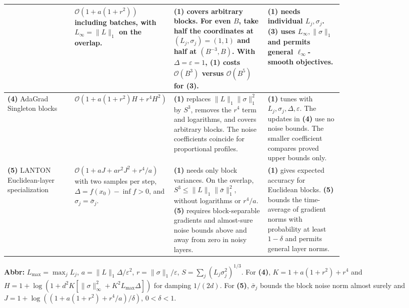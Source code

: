 \begin{table}[tp]
\begin{threeparttable}
\begin{tabularx}{\linewidth}{@{}>{\raggedright\arraybackslash}p{0.20\linewidth}>{\raggedright\arraybackslash}p{0.29\linewidth}>{\raggedright\arraybackslash}p{0.29\linewidth}>{\raggedright\arraybackslash}X@{}}
& $\mathcal{O}\!\left(1+a(1+r^2)\right)$ including batches, with $L_\infty=\|L\|_1$ on the overlap.
& \textbf{(1)} covers arbitrary blocks. For even $B$, take half the coordinates at $(L_j,\sigma_j)=(1,1)$ and half at $(B^{-3},B)$. With $\Delta=\varepsilon=1$, \textbf{(1)} costs $\mathcal{O}(B^3)$ versus $\mathcal{O}(B^5)$ for \textbf{(3)}.
& \textbf{(1)} needs individual $L_j,\sigma_j$. \textbf{(3)} uses $L_\infty,\|\sigma\|_1$ and permits general $\ell_\infty$-smooth objectives. \\
\midrule
\textbf{(4)} AdaGrad \citep{bhnJiang2025}\newline Singleton blocks
& $\mathcal{O}\!\left(1+a(1+r^2)H+r^4H^2\right)$
& \textbf{(1)} replaces $\|L\|_1\|\sigma\|_1^2$ by $S^3$, removes the $r^4$ term and logarithms, and covers arbitrary blocks. The noise coefficients coincide for proportional profiles.
& \textbf{(1)} tunes with $L_j,\sigma_j,\Delta,\varepsilon$. The updates in \textbf{(4)} use no noise bounds. The smaller coefficient compares proved upper bounds only. \\
\midrule
\textbf{(5)} LANTON \citep{bhnHao2026v2}\newline Euclidean-layer specialization
& $\mathcal{O}\!\left(1+aJ+ar^2J^2+r^4/a\right)$ with two samples per step, $\Delta=f(x_0)-\inf f>0$, and $\sigma_j=\bar\sigma_j$.
& \textbf{(1)} needs only block variances. On the overlap, $S^3\le\|L\|_1\|\bar\sigma\|_1^2$, without logarithms or $r^4/a$. \textbf{(5)} requires block-separable gradients and almost-sure noise bounds above and away from zero in noisy layers.
& \textbf{(1)} gives expected accuracy for Euclidean blocks. \textbf{(5)} bounds the time-average of gradient norms with probability at least $1-\delta$ and permits general layer norms. \\
\bottomrule
\end{tabularx}
\begin{tablenotes}[flushleft]\footnotesize
\item[] \textbf{Abbr:} $L_{\max}=\max_j L_j$, $a=\|L\|_1\Delta/\varepsilon^2$, $r=\|\sigma\|_1/\varepsilon$, $S=\sum_j(L_j\sigma_j^2)^{1/3}$.
For \textbf{(4)}, $K=1+a(1+r^2)+r^4$ and $H=1+\log(1+d^2 K[\|\sigma\|_\infty^2+K^2 L_{\max}\Delta])$ for damping $1/(2d)$.
For \textbf{(5)}, $\bar\sigma_j$ bounds the block noise norm almost surely and $J=1+\log((1+a(1+r^2)+r^4/a)/\delta)$, $0<\delta<1$.
\end{tablenotes}
\end{threeparttable}
\end{table}
